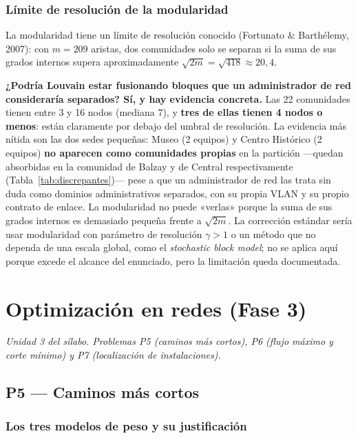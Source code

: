 \documentclass[10pt,a4paper]{extarticle}
\begin{document}
\subsubsection{Límite de resolución de la modularidad}

La modularidad tiene un límite de resolución conocido (Fortunato \& Barthélemy, 2007): con
$m = 209$ aristas, dos comunidades solo se separan si la suma de sus grados internos supera
aproximadamente $\sqrt{2m} = \sqrt{418} \approx 20{,}4$.

\textbf{¿Podría Louvain estar fusionando bloques que un administrador de red consideraría
separados? Sí, y hay evidencia concreta.} Las 22 comunidades tienen entre 3 y 16 nodos
(mediana 7), y \textbf{tres de ellas tienen 4 nodos o menos}: están claramente por debajo
del umbral de resolución. La evidencia más nítida son las dos sedes pequeñas: Museo (2
equipos) y Centro Histórico (2 equipos) \textbf{no aparecen como comunidades propias} en la
partición ---quedan absorbidas en la comunidad de Balzay y de Central respectivamente
(Tabla~\ref{tab:discrepantes})--- pese a que un administrador de red las trata sin duda como
dominios administrativos separados, con su propia VLAN y su propio contrato de enlace. La
modularidad no puede «verlas» porque la suma de sus grados internos es demasiado pequeña
frente a $\sqrt{2m}$. La corrección estándar sería usar modularidad con parámetro de
resolución $\gamma > 1$ o un método que no dependa de una escala global, como el
\textit{stochastic block model}; no se aplica aquí porque excede el alcance del enunciado,
pero la limitación queda documentada.

\section{Optimización en redes (Fase 3)}

\textit{Unidad 3 del sílabo. Problemas P5 (caminos más cortos), P6 (flujo máximo y corte
mínimo) y P7 (localización de instalaciones).}

\subsection{P5 --- Caminos más cortos}

\subsubsection{Los tres modelos de peso y su justificación}
\end{document}
